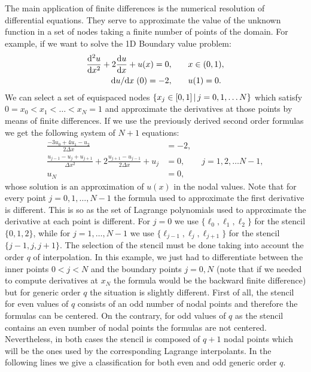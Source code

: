     The main application of finite differences is the numerical resolution of differential equations. They serve to approximate the value of the unknown function in a set of nodes taking a finite number of points of the domain. For example, if we want to solve the 1D Boundary value problem:
    \begin{align*}
    	\dv[2]{u}{x} + 2\dv{u}{x} + u(x) = 0,
    	\qquad & x \in (0,1),
    	\\
    	\dv*{u}{x}{}(0)=-2, \qquad & u(1)=0.
    \end{align*} 
    We can select a set of equispaced nodes $\left\lbrace x_j\in[0,1] \,\middle|\, j=0,1,\ldots N  \right\rbrace$ which satisfy $0=x_0<x_1<\dots<x_N=1$ and approximate the derivatives at those points by means of finite differences. If we use the previously derived second order formulas we get the following system of $N+1$ equations:
    \begin{align*}
    	\frac{-3u_0 + 4u_1 - u_2}{2\Delta x} &= -2, 
    	\\
    	\frac{u_{j-1}-u_j+u_{j+1}}{\Delta x^2}
    	+
    	2\frac{u_{j+1}-u_{j-1}}{2\Delta x}
    	+
    	u_j &= 0,
    	\qquad j=1,2,\ldots N-1,
    	\\
    	u_N &= 0,
    \end{align*}
    whose solution is an approximation of $u(x)$ in the nodal values. Note that for every point $j=0,1,\ldots,N-1$ the formula used to approximate the first derivative is different. This is so as the set of Lagrange polynomials used to approximate the derivative at each point is different. For $j=0$ we use $\{\ell_0,\ell_1,\ell_2\}$ for the stencil $\{0,1,2\}$, while for $j=1,\ldots,N-1$ we use $\{\ell_{j-1},\ell_{j},\ell_{j+1}\}$ for the stencil $\{j-1,j,j+1\}$. The selection of the stencil must be done taking into account the order $q$ of interpolation. In this example, we just had to differentiate between the inner points $0<j<N$ and the boundary points $j=0,N$ (note that if we needed to compute derivatives at $x_N$ the formula would be the backward finite difference) but for generic order $q$ the situation is slightly different. First of all, the stencil for even values of $q$ consists of an odd number of nodal points and therefore the formulas can be centered. On the contrary, for odd values of $q$ as the stencil contains an even number of nodal points the formulas are not centered. Nevertheless, in both cases the stencil is composed of $q+1$ nodal points which will be the ones used by the corresponding Lagrange interpolants. In the following lines we give a classification for both even and odd generic order $q$.
